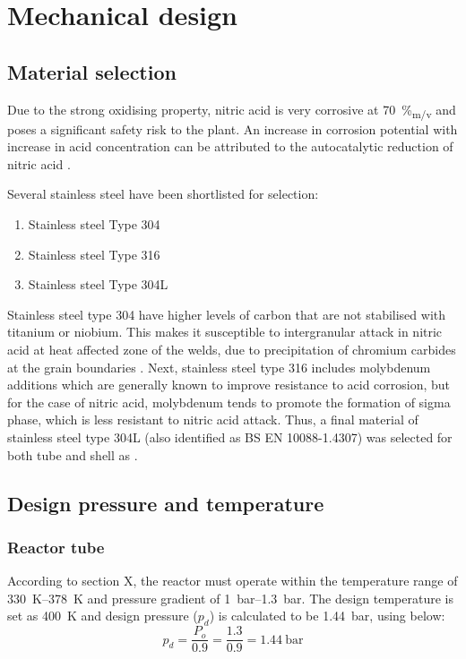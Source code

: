 \section{Mechanical design}
\subsection{Material selection}
Due to the strong oxidising property, nitric acid is very corrosive at \SI{70}{\%_{m/v}} and poses a significant safety risk to the plant. An increase in corrosion potential with increase in acid concentration can be attributed to the autocatalytic reduction of nitric acid
\cite{suresh_corrosion_nodate}. 

Several stainless steel have been shortlisted for selection: 
\begin{enumerate}
    \item Stainless steel Type 304
    \item Stainless steel Type 316
    \item Stainless steel Type 304L
\end{enumerate}

Stainless steel type 304 have higher levels of carbon that are not stabilised with titanium or niobium. This makes it susceptible to intergranular attack in nitric acid at heat affected zone of the welds, due to precipitation of chromium carbides at the grain boundaries \cite{cm_selection_nodate} . Next, stainless steel type 316 includes molybdenum additions which are generally known to improve resistance to acid corrosion, but for the case of nitric acid, molybdenum tends to promote the formation of sigma phase, which is less resistant to nitric acid attack. Thus, a final material of stainless steel type 304L (also identified as BS EN 10088-1.4307) was selected for both tube and shell as .

\subsection{Design pressure and temperature}
\subsubsection{Reactor tube}
According to section X, the reactor must operate within the temperature range of \SIrange{330}{378}{\K} and pressure gradient of \SIrange{1}{1.3}{\bar}. The design temperature is set as \SI{400}{\K} and design pressure ($p_d$) is calculated to be \SI{1.44}{\bar}, using  below:
\begin{equation}
    p_d = \frac{P_o}{0.9} = \frac{1.3}{0.9} = \SI{1.44}{\bar}
    \label{eqn:designpressure}
\end{equation}

